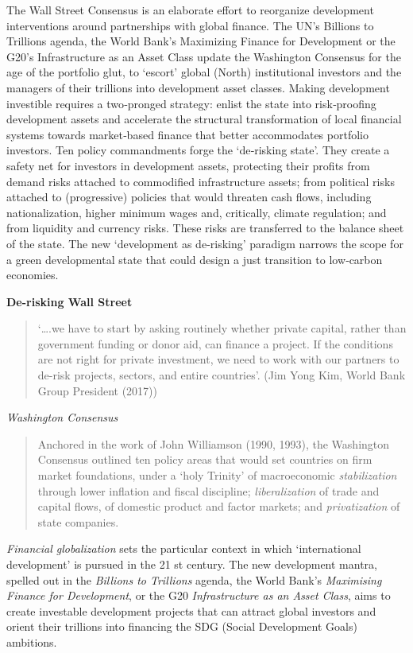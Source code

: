 \documentclass[
]{book}
\begin{document}
The Wall Street Consensus is an elaborate effort to reorganize development interventions around partnerships with global finance. The UN's Billions to Trillions agenda, the World Bank's Maximizing Finance for Development or the G20's Infrastructure as an Asset Class update the Washington Consensus for the age of the portfolio glut, to `escort' global (North) institutional investors and the managers of their trillions into development asset classes. Making development investible requires a two‐pronged strategy: enlist the state into risk‐proofing development assets and accelerate the structural transformation of local financial systems towards market‐based finance that better accommodates portfolio investors. Ten policy commandments forge the `de‐risking state'. They create a safety net for investors in development assets, protecting their profits from demand risks attached to commodified infrastructure assets; from political risks attached to (progressive) policies that would threaten cash flows, including nationalization, higher minimum wages and, critically, climate regulation; and from liquidity and currency risks. These risks are transferred to the balance sheet of the state. The new `development as de‐risking' paradigm narrows the scope for a green developmental state that could design a just transition to low‐carbon economies.

\textbf{De-risking Wall Street}

\begin{quote}
`\ldots.we have to start by asking routinely whether private capital,
rather than government funding or donor aid, can finance a
project. If the conditions are not right for private investment, we
need to work with our partners to de-risk projects, sectors, and
entire countries'.
(Jim Yong Kim, World Bank Group President (2017))
\end{quote}

\emph{Washington Consensus}

\begin{quote}
Anchored in the work of John Williamson (1990, 1993),
the Washington Consensus outlined ten policy areas that would set countries on firm
market foundations, under a `holy Trinity' of macroeconomic \emph{stabilization} through
lower inflation and fiscal discipline; \emph{liberalization} of trade and capital flows, of
domestic product and factor markets; and \emph{privatization} of state companies.
\end{quote}

\emph{Financial globalization} sets the particular context in which
`international development' is pursued in the 21 st century.
The new development mantra, spelled out in the \emph{Billions to Trillions} agenda, the World
Bank's \emph{Maximising Finance for Development}, or the G20 \emph{Infrastructure as an Asset
Class}, aims to create investable development projects that can attract global investors
and orient their trillions into financing the SDG (Social Development Goals) ambitions.
\end{document}
